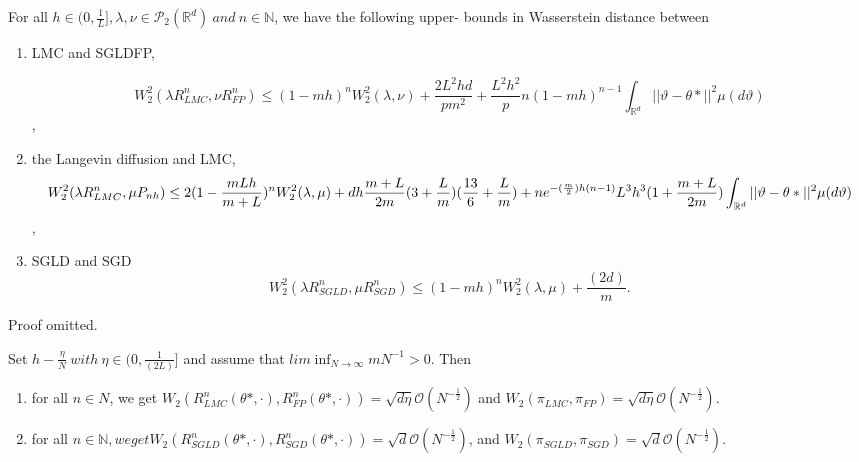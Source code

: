 \begin{theorem}
For all $h\in(0,\frac{1}{L}], \lambda, \nu\in \mathcal{P}_2(\mathbb{R}^d)\ and \ n\in\mathbb{N}$, we have the following upper- bounds in Wasserstein distance between
\begin{enumerate}
	\item 
	LMC and SGLDFP,

\begin{dmath}	
W_2^2(\lambda R_{LMC}^n, \nu R_{FP}^n)\leq(1-mh)^nW_2^2(\lambda, \nu) + \frac{2L^2h d}{pm^2}+\frac{L^2h^2}{p}n(1-mh)^{n-1}\int_{\mathbb{R}^d}||\vartheta-\theta*||^2 \mu(d\vartheta)
\end{dmath},
	\item 
	the Langevin diffusion and LMC,
\begin{dmath}
W_2^2(\lambda R_{LMC}^n, \mu P_{nh})\leq2(1-\frac{mLh}{m+L})^nW_2^2(\lambda, \mu)+dh\frac{m+L}{2m}(3+\frac{L}{m})(\frac{13}{6}+\frac{L}{m})\\+ne^{-(\frac{m}{2})h(n-1)}L^3h^3(1+\frac{m+L}{2m})\int_{\mathbb{R}^d}||\vartheta - \theta*||^2 \mu(d\vartheta)
\end{dmath},
	\item 
	SGLD and SGD
	\begin{dmath}
	W_2^2(\lambda R_{SGLD}^n, \mu R_{SGD}^n)\leq (1-mh)^n W_2^2(\lambda, \mu)+\frac{(2d)}{m}.
	\end{dmath}
\end{enumerate}
\end{theorem}
Proof omitted.
\begin{cor}
Set $h - \frac{\eta}{N} \ with \ \eta \in (0, \frac{1}{(2L)}]$ and assume that $lim \inf_{N \to \infty}mN^{-1}>0$. Then
\begin{enumerate}
\item
for all $n \in N$, we get $W_2(R_{LMC}^n(\theta*, \cdot), R_{FP}^{n}(\theta*, \cdot)) = \sqrt{d\eta}\mathcal{O}(N^{-\frac{1}{2}})$ and $W_2(\pi_{LMC}, \pi_{FP}) = \sqrt{d\eta}\mathcal{O}(N^{-\frac{1}{2}})$.
\item 
for all $n\in \mathbb{N}, we get W_2(R_{SGLD}^{n}(\theta*, \cdot), R^n_{SGD}(\theta*, \cdot)) = \sqrt{d}\mathcal{O}(N^{-\frac{1}{2}})$, and $W_2(\pi_{SGLD}, \pi_{SGD}) = \sqrt{d}\mathcal{O}(N^{-\frac{1}{2}})$.
\end{enumerate}
\end{cor}